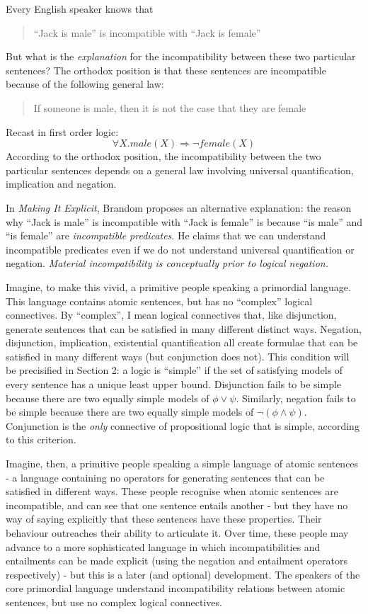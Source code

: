 Every English speaker knows that
\begin{quote}
``Jack is male'' is incompatible with ``Jack is female''
\end{quote}
But what is the \emph{explanation} for the incompatibility between these two particular sentences? 
The orthodox position is that these sentences are incompatible because of the following general law:
\begin{quote}
If someone is male, then it is not the case that they are female
\end{quote}
Recast in first order logic:
\[
\forall X. male(X) \Rightarrow \neg female(X)
\]
According to the orthodox position, the incompatibility between the two particular sentences depends on a general law involving universal quantification, implication and negation. 

In \emph{Making It Explicit}\cite{brandom2}, Brandom proposes an alternative explanation:
the reason why ``Jack is male'' is incompatible with ``Jack is female'' is because ``is male'' and ``is female'' are \emph{incompatible predicates}.
He claims that we can understand incompatible predicates even if we do not understand universal quantification or negation.  \emph{Material incompatibility is
conceptually prior to logical negation.}

Imagine, to make this vivid, a primitive people speaking a
primordial language.  This language contains atomic sentences, but has
no ``complex'' logical connectives.  By ``complex'', I mean logical
connectives that, like disjunction, generate sentences that can be
satisfied in many different distinct ways.  Negation, disjunction,
implication, existential quantification all create formulae that can
be satisfied in many different ways (but conjunction does not). This condition will be
precisified in Section 2: a logic is ``simple'' if the set of
satisfying models of every sentence has a unique least upper
bound. Disjunction fails to be simple because there are two equally
simple models of $\phi \lor \psi$. Similarly, negation fails to be simple
because there are two equally simple models of $\neg (\phi \land
\psi)$. Conjunction is the \emph{only} connective of propositional logic that is simple,
according to this criterion.

Imagine, then, a primitive people speaking a simple language of
atomic sentences - a language containing no operators for generating
sentences that can be satisfied in different ways.  These people
recognise when atomic sentences are incompatible, and can see that one
sentence entails another - but they have no way of saying explicitly
that these sentences have these properties.  Their behaviour
outreaches their ability to articulate it.  Over time, these people
may advance to a more sophisticated language in which
incompatibilities and entailments can be made explicit (using the
negation and entailment operators respectively) - but this is a later
(and optional) development. The speakers of the core primordial
language understand incompatibility relations between atomic
sentences, but use no complex logical connectives.

